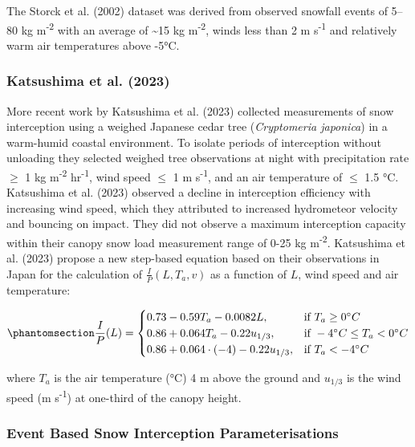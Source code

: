 \documentclass[
  letterpaper,
]{tex/uofsthesis-cs}
\begin{document}
The Storck et al. (2002) dataset was derived from observed snowfall
events of 5--80 kg m\textsuperscript{-2} with an average of
\textasciitilde15 kg m\textsuperscript{-2}, winds less than 2 m
s\textsuperscript{-1} and relatively warm air temperatures above -5°C.

\subsubsection{Katsushima et al. (2023)}\label{katsushima2023}

More recent work by Katsushima et al. (2023) collected measurements of
snow interception using a weighed Japanese cedar tree (\emph{Cryptomeria
japonica}) in a warm-humid coastal environment. To isolate periods of
interception without unloading they selected weighed tree observations
at night with precipitation rate \(\ge\) 1 kg m\textsuperscript{-2}
hr\textsuperscript{-1}, wind speed \(\le\) 1 m s\textsuperscript{-1},
and an air temperature of \(\le\) 1.5 °C. Katsushima et al. (2023)
observed a decline in interception efficiency with increasing wind
speed, which they attributed to increased hydrometeor velocity and
bouncing on impact. They did not observe a maximum interception capacity
within their canopy snow load measurement range of 0-25 kg
m\textsuperscript{-2}. Katsushima et al. (2023) propose a new step-based
equation based on their observations in Japan for the calculation of
\(\frac{I}{P}(L, T_a, v)\) as a function of \(L\), wind speed and air
temperature:

\begin{equation}\phantomsection\label{eq-kat-ip}{
\frac{I}{P}(L) = \begin{cases}
    0.73-0.59T_a-0.0082L,& \text{if } T_a\geq 0 ^{\circ} C \\
    0.86+0.064T_a-0.22u_{1/3},              & \text{if } -4 ^{\circ} C \leq T_a <0 ^{\circ} C \\
        0.86+0.064\cdot(-4)-0.22u_{1/3},              & \text{if } T_a < -4 ^{\circ} C
\end{cases}
}\end{equation}

where \(T_a\) is the air temperature (°C) 4 m above the ground and
\(u_{1/3}\) is the wind speed (m s\textsuperscript{-1}) at one-third of
the canopy height.

\subsubsection{Event Based Snow Interception
Parameterisations}\label{event-based-snow-interception-parameterisations}
\end{document}
